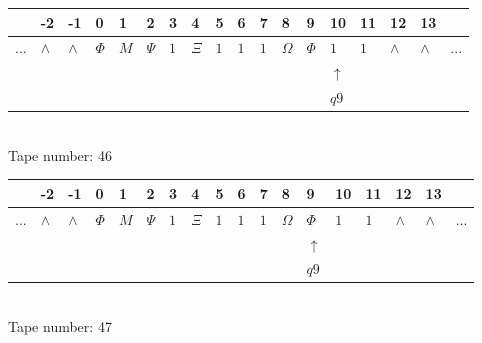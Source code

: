 \documentclass[11pt]{article}
\begin{document}
\begin{table}[H]
\centering
\begin{tabular}{llllllllllllllllll}
 & -2 & -1 & 0 & 1 & 2 & 3 & 4 & 5 & 6 & 7 & 8 & 9 & 10 & 11 & 12 & 13 & \\
\hline
$...$ & \multicolumn{1}{|l|}{$\wedge$} & \multicolumn{1}{|l|}{$\wedge$} & \multicolumn{1}{|l|}{$\Phi$} & \multicolumn{1}{|l|}{$M$} & \multicolumn{1}{|l|}{$\Psi$} & \multicolumn{1}{|l|}{$1$} & \multicolumn{1}{|l|}{$\Xi$} & \multicolumn{1}{|l|}{$1$} & \multicolumn{1}{|l|}{$1$} & \multicolumn{1}{|l|}{$1$} & \multicolumn{1}{|l|}{$\Omega$} & \multicolumn{1}{|l|}{$\Phi$} & \multicolumn{1}{|l|}{$1$} & \multicolumn{1}{|l|}{$1$} & \multicolumn{1}{|l|}{$\wedge$} & \multicolumn{1}{|l|}{$\wedge$} & $...$\\
\hline
&  &  &  &  &  &  &  &  &  &  &  &  & $\uparrow$ &  &  &  &  \\
&  &  &  &  &  &  &  &  &  &  &  &  & $ q9 $ &  &  &  &  \\
\end{tabular}
\\
Tape number: 46
\noindent\makebox[\linewidth]{\hdashrule{\textwidth}{1pt}{1pt}}\end{table}

\begin{table}[H]
\centering
\begin{tabular}{llllllllllllllllll}
 & -2 & -1 & 0 & 1 & 2 & 3 & 4 & 5 & 6 & 7 & 8 & 9 & 10 & 11 & 12 & 13 & \\
\hline
$...$ & \multicolumn{1}{|l|}{$\wedge$} & \multicolumn{1}{|l|}{$\wedge$} & \multicolumn{1}{|l|}{$\Phi$} & \multicolumn{1}{|l|}{$M$} & \multicolumn{1}{|l|}{$\Psi$} & \multicolumn{1}{|l|}{$1$} & \multicolumn{1}{|l|}{$\Xi$} & \multicolumn{1}{|l|}{$1$} & \multicolumn{1}{|l|}{$1$} & \multicolumn{1}{|l|}{$1$} & \multicolumn{1}{|l|}{$\Omega$} & \multicolumn{1}{|l|}{$\Phi$} & \multicolumn{1}{|l|}{$1$} & \multicolumn{1}{|l|}{$1$} & \multicolumn{1}{|l|}{$\wedge$} & \multicolumn{1}{|l|}{$\wedge$} & $...$\\
\hline
&  &  &  &  &  &  &  &  &  &  &  & $\uparrow$ &  &  &  &  &  \\
&  &  &  &  &  &  &  &  &  &  &  & $ q9 $ &  &  &  &  &  \\
\end{tabular}
\\
Tape number: 47
\noindent\makebox[\linewidth]{\hdashrule{\textwidth}{1pt}{1pt}}\end{table}
\clearpage
\end{document}
